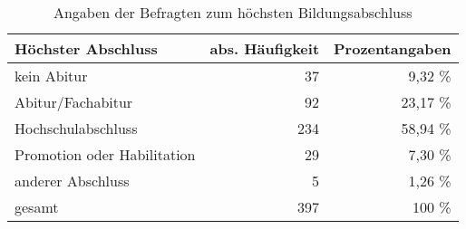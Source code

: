 \begin{table}
\centering
\begin{tabular}{lrr}
\textbf{Höchster Abschluss} & \multicolumn{1}{l}{\textbf{abs. Häufigkeit}} & \multicolumn{1}{l}{\textbf{Prozentangaben}} \\ \hline
kein Abitur & 37 & 9,32 \%\\ %
Abitur/Fachabitur & 92 & 23,17 \%\\ %
Hochschulabschluss & 234 & 58,94 \%\\ %
Promotion oder Habilitation & 29 & 7,30 \%\\ %
anderer Abschluss & 5 & 1,26 \%\\ %
gesamt & 397 & 100 \%
\end{tabular}
\caption{Angaben der Befragten zum höchsten Bildungsabschluss}
\label{table:BildungsstandAnh}
\end{table}


